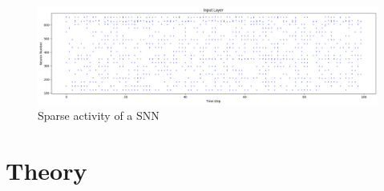 \begin{frame}[allowframebreaks]
		\begin{figure}
			\centering
			\includegraphics[width=\linewidth]{images/sparsity}
			\caption{Sparse activity of a SNN}
			\label{fig:sparsity}
		\end{figure}
		
\end{frame}

\section{Theory}
